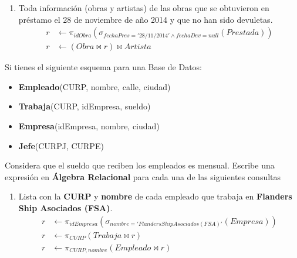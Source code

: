 \documentclass{article}
\begin{document}
\begin{enumerate}
{\begin{enumerate}
{\begin{align*}
                        maxP &\leftarrow \pi_{idObra}(maxP) \bowtie Obra
                    \end{align*}
                }
                \item {
                    Toda información (obras y artistas) de las obras que se
                    obtuvieron en préstamo el 28 de noviembre de año 2014 y que
                    no han sido devuletas.
                    \begin{align*}
                        r &\leftarrow \pi_{idObra}(\sigma_{fechaPres = '28/11/2014' \land
                        fechaDev=null}(Prestada))\\
                        r &\leftarrow (Obra \bowtie r)\bowtie Artista
                    \end{align*}
                }
            \end{enumerate}
            \item {
                Si tienes el siguiente esquema para una Base de Datos:
                \begin{itemize}[label={}]
                    \item \textbf{Empleado}(CURP, nombre, calle, ciudad)
                    \item \textbf{Trabaja}(CURP, idEmpresa, sueldo)
                    \item \textbf{Empresa}(idEmpresa, nombre, ciudad)
                    \item \textbf{Jefe}(CURPJ, CURPE)
                \end{itemize}
                Considera que el sueldo que reciben los empleados es mensual.
                Escribe una expresión en \textbf{Álgebra Relacional} para cada
                una de las siguientes consultas
                \begin{enumerate}
                    \item {
                        Lista con la \textbf{CURP} y \textbf{nombre} de cada
                        empleado que trabaja en \textbf{Flanders Ship Asociados
                        (FSA)}.
                        \begin{align*}
                            r &\leftarrow \pi_{idEmpresa}(\sigma_{nombre = 
                            'Flanders Ship Asociados(FSA)'}(Empresa)) \\
                            r &\leftarrow \pi_{CURP}(Trabaja \bowtie r) \\
                            r &\leftarrow \pi_{CURP, nombre}(Empleado \bowtie r)

\end{align*}}
\end{enumerate}}}
\end{enumerate}
\end{document}
